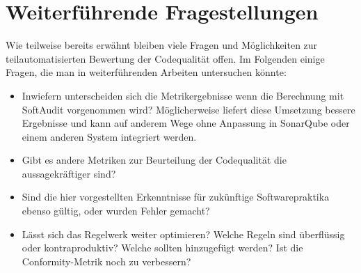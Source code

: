 \documentclass[da,ngerman]{stthesis}
\begin{document}
		\section{Weiterführende Fragestellungen}
			Wie teilweise bereits erwähnt bleiben viele Fragen und Möglichkeiten zur teilautomatisierten Bewertung der Codequalität offen. Im Folgenden einige Fragen, die man in weiterführenden Arbeiten untersuchen könnte:
			\begin{itemize}
				\item Inwiefern unterscheiden sich die Metrikergebnisse wenn die Berechnung mit SoftAudit vorgenommen wird? Möglicherweise liefert diese Umsetzung bessere Ergebnisse und kann auf anderem Wege ohne Anpassung in SonarQube oder einem anderen System integriert werden.
				\item Gibt es andere Metriken zur Beurteilung der Codequalität die aussagekräftiger sind?
				\item Sind die hier vorgestellten Erkenntnisse für zukünftige Softwarepraktika ebenso gültig, oder wurden Fehler gemacht?
				\item Lässt sich das Regelwerk weiter optimieren? Welche Regeln sind überflüssig oder kontraproduktiv? Welche sollten hinzugefügt werden? Ist die Conformity-Metrik noch zu verbessern?
			\end{itemize}			 		
  		
  	\backmatter
  
  	\appendix
  	
  
\end{document}
